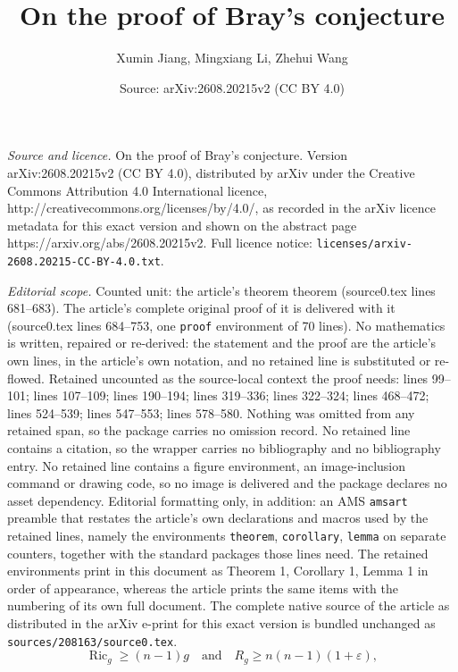 \documentclass[10pt,a4paper]{amsart}
\title{On the proof of Bray's conjecture}
\author{Xumin Jiang, Mingxiang Li, Zhehui Wang}
\date{Source: arXiv:2608.20215v2 (CC BY 4.0)}
\begin{document}
\maketitle

\noindent\emph{Source and licence.} On the proof of Bray's conjecture. Version arXiv:2608.20215v2 (CC BY 4.0), distributed by arXiv under the Creative Commons Attribution 4.0 International licence, http://creativecommons.org/licenses/by/4.0/, as recorded in the arXiv licence metadata for this exact version and shown on the abstract page https://arxiv.org/abs/2608.20215v2. Full licence notice: \texttt{licenses/arxiv-2608.20215-CC-BY-4.0.txt}.\par\smallskip

\noindent\textit{Editorial scope.} Counted unit: the article's theorem theorem (source0.tex lines 681--683). The article's complete original proof of it is delivered with it (source0.tex lines 684--753, one \texttt{proof} environment of 70 lines). No mathematics is written, repaired or re-derived: the statement and the proof are the article's own lines, in the article's own notation, and no retained line is substituted or re-flowed.  Retained uncounted as the source-local context the proof needs: lines 99--101; lines 107--109; lines 190--194; lines 319--336; lines 322--324; lines 468--472; lines 524--539; lines 547--553; lines 578--580.  Nothing was omitted from any retained span, so the package carries no omission record.  No retained line contains a citation, so the wrapper carries no bibliography and no bibliography entry.  No retained line contains a figure environment, an image-inclusion command or drawing code, so no image is delivered and the package declares no asset dependency.  Editorial formatting only, in addition: an AMS \texttt{amsart} preamble that restates the article's own declarations and macros used by the retained lines, namely the environments \texttt{theorem}, \texttt{corollary}, \texttt{lemma} on separate counters, together with the standard packages those lines need.  The retained environments print in this document as Theorem 1, Corollary 1, Lemma 1 in order of appearance, whereas the article prints the same items with the numbering of its own full document.  The complete native source of the article as distributed in the arXiv e-print for this exact version is bundled unchanged as \texttt{sources/208163/source0.tex}.
\begin{equation}\label{Kwong's-condition}
    \operatorname{Ric}_g \geq (n-1)g \quad \text{and} \quad R_g \geq n(n-1)(1+\varepsilon),
\end{equation}
\end{document}
